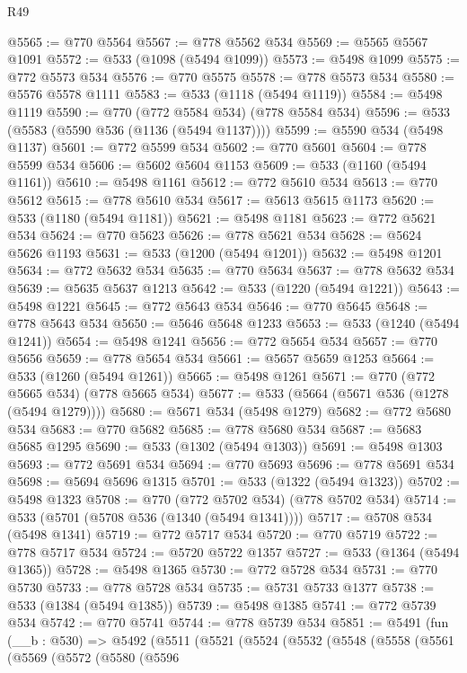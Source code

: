 \begin{lexlean}{R49}
\begin{coremodule}
@5565 := @770 @5564
@5567 := @778 @5562 @534
@5569 := @5565 @5567 @1091
@5572 := @533 (@1098 (@5494 @1099))
@5573 := @5498 @1099
@5575 := @772 @5573 @534
@5576 := @770 @5575
@5578 := @778 @5573 @534
@5580 := @5576 @5578 @1111
@5583 := @533 (@1118 (@5494 @1119))
@5584 := @5498 @1119
@5590 := @770 (@772 @5584 @534) (@778 @5584 @534)
@5596 := @533 (@5583 (@5590 @536 (@1136 (@5494 @1137))))
@5599 := @5590 @534 (@5498 @1137)
@5601 := @772 @5599 @534
@5602 := @770 @5601
@5604 := @778 @5599 @534
@5606 := @5602 @5604 @1153
@5609 := @533 (@1160 (@5494 @1161))
@5610 := @5498 @1161
@5612 := @772 @5610 @534
@5613 := @770 @5612
@5615 := @778 @5610 @534
@5617 := @5613 @5615 @1173
@5620 := @533 (@1180 (@5494 @1181))
@5621 := @5498 @1181
@5623 := @772 @5621 @534
@5624 := @770 @5623
@5626 := @778 @5621 @534
@5628 := @5624 @5626 @1193
@5631 := @533 (@1200 (@5494 @1201))
@5632 := @5498 @1201
@5634 := @772 @5632 @534
@5635 := @770 @5634
@5637 := @778 @5632 @534
@5639 := @5635 @5637 @1213
@5642 := @533 (@1220 (@5494 @1221))
@5643 := @5498 @1221
@5645 := @772 @5643 @534
@5646 := @770 @5645
@5648 := @778 @5643 @534
@5650 := @5646 @5648 @1233
@5653 := @533 (@1240 (@5494 @1241))
@5654 := @5498 @1241
@5656 := @772 @5654 @534
@5657 := @770 @5656
@5659 := @778 @5654 @534
@5661 := @5657 @5659 @1253
@5664 := @533 (@1260 (@5494 @1261))
@5665 := @5498 @1261
@5671 := @770 (@772 @5665 @534) (@778 @5665 @534)
@5677 := @533 (@5664 (@5671 @536 (@1278 (@5494 @1279))))
@5680 := @5671 @534 (@5498 @1279)
@5682 := @772 @5680 @534
@5683 := @770 @5682
@5685 := @778 @5680 @534
@5687 := @5683 @5685 @1295
@5690 := @533 (@1302 (@5494 @1303))
@5691 := @5498 @1303
@5693 := @772 @5691 @534
@5694 := @770 @5693
@5696 := @778 @5691 @534
@5698 := @5694 @5696 @1315
@5701 := @533 (@1322 (@5494 @1323))
@5702 := @5498 @1323
@5708 := @770 (@772 @5702 @534) (@778 @5702 @534)
@5714 := @533 (@5701 (@5708 @536 (@1340 (@5494 @1341))))
@5717 := @5708 @534 (@5498 @1341)
@5719 := @772 @5717 @534
@5720 := @770 @5719
@5722 := @778 @5717 @534
@5724 := @5720 @5722 @1357
@5727 := @533 (@1364 (@5494 @1365))
@5728 := @5498 @1365
@5730 := @772 @5728 @534
@5731 := @770 @5730
@5733 := @778 @5728 @534
@5735 := @5731 @5733 @1377
@5738 := @533 (@1384 (@5494 @1385))
@5739 := @5498 @1385
@5741 := @772 @5739 @534
@5742 := @770 @5741
@5744 := @778 @5739 @534
@5851 := @5491
    (fun (__b : @530) =>
    @5492
      (@5511
        (@5521
          (@5524
            (@5532
              (@5548
                (@5558
                  (@5561
                    (@5569
                      (@5572
                        (@5580
                          (@5596

\end{coremodule}
\end{lexlean}
